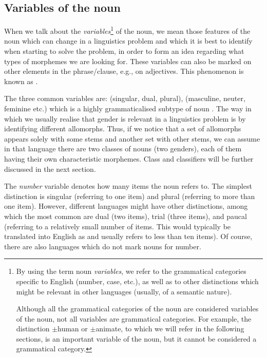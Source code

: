 \begin{refsection}
\section{Variables of the noun}\label{sec:variables-of-the-noun}

When we talk about the \textit{variables}\footnote{By using the term noun \textit{variables}, we refer to the grammatical categories specific to English (number, case, etc.), as well as to other distinctions which might be relevant in other languages (usually, of a semantic nature).

Although all the grammatical categories of the noun are considered variables of the noun, not all variables are grammatical categories. For example, the distinction $\pm$human or $\pm$animate, to which we will refer in the following sections, is an important variable of the noun, but it cannot be considered a grammatical category.} of the noun, we mean those features of the noun which can change in a linguistics problem and which it is best to identify when starting to solve the problem, in order to form an idea regarding what types of morphemes we are looking for. These variables can also be marked on other elements in the phrase/clause, e.g., on adjectives. This phenomenon is known as .

The three common variables are:  (singular, dual, plural),  (masculine, neuter, feminine etc.) which is a highly grammaticalised subtype of noun . The way in which we usually realise that gender is relevant in a linguistics problem is by identifying different allomorphs. Thus, if we notice that a set of allomorphs appears solely with some stems and another set with other stems, we can assume in that language there are two classes of nouns (two genders), each of them having their own characteristic morphemes. Class and classifiers will be further discussed in the next section.

The \emph{number} variable denotes how many items the noun refers to. The simplest distinction is singular (referring to one item) and plural (referring to more than one item). However, different languages might have other distinctions, among which the most common are dual (two items), trial (three items), and paucal (referring to a relatively small number of items. This would typically be translated into English as  and usually refers to less than ten items). Of course, there are also languages which do not mark nouns for number.


\end{refsection}
